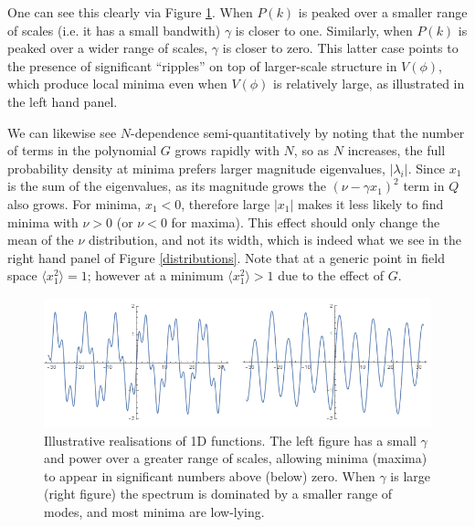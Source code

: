 \documentclass[12pt]{article}
\begin{document}
One can see this clearly via Figure \ref{examples1}. When $P(k)$ is peaked over a smaller range of scales (i.e. it has a small bandwith) $\gamma$ is closer to one. Similarly, when $P(k)$ is peaked over a wider range of scales, $\gamma$ is closer to zero. This latter case points to the presence of significant ``ripples'' on top of larger-scale structure in $V(\phi)$, which produce local minima even when $V(\phi)$ is relatively large, as illustrated in the left hand panel.


We can likewise see $N$-dependence semi-quantitatively by noting that the number of terms in the polynomial $G$ grows rapidly with $N$, so as $N$ increases, the full probability density at minima prefers larger magnitude eigenvalues, $|\lambda_i|$. Since $x_1$ is the sum of the eigenvalues, as its magnitude grows the $(\nu-\gamma x_1)^2$ term in $Q$ also grows. For minima, $x_1<0$, therefore large $|x_1|$ makes it less likely to find minima with $\nu >0$ (or $\nu <0 $ for maxima). This effect should only change the mean of the $\nu$ distribution, and not its width, which is indeed what we see in the right hand panel of Figure \ref{distributions}. Note that at a generic point in field space $\langle x_1^2\rangle = 1$; however at a minimum $\langle x_1^2 \rangle >1$ due to the effect of $G$.   


\begin{figure}
  \centering
    \includegraphics[width=\linewidth]{TwoSigmas.png}
  \caption{Illustrative realisations of 1D functions. The left figure has a small $\gamma$ and power over a greater range of scales, allowing minima (maxima) to appear in significant numbers above (below) zero. When $\gamma$ is large (right figure) the spectrum is dominated by a smaller range of modes, and most minima are low-lying.}
  \label{examples1}
\end{figure}
\end{document}

